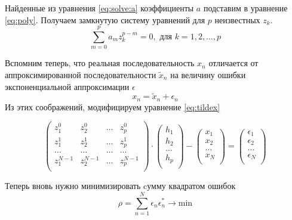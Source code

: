 \documentclass[a4paper,14pt]{extarticle}
\begin{document}
Найденные из уравнения \eqref{eq:solve:a} коэффициенты $a$ подставим в
уравнение  \eqref{eq:poly}. Получаем замкнутую систему уравнений для $p$
неизвестных  $z_k$.
\begin{equation}
    \sum\limits_{m=0}^{p} a_m z_k^{p-m} = 0, \text{ для } k = 1,2,\dots,p
\end{equation}



Вспомним теперь, что реальная последовательность $x_n$ отличается от
аппроксимированной последовательности  $\tilde x_n$ на величину ошибки
экспоненциальной аппроксимации  $\epsilon$
\begin{equation}
    \label{eq:}
    x_n = \tilde x_n + \epsilon_n
\end{equation}
Из этих соображений, модифицируем уравнение \eqref{eq:tildex} 

\begin{equation}
    \label{eq:x}
    \begin{pmatrix}
        z_1^0 & z_2^0 & \dots & z_p^0 \\ 
        z_1^1 & z_2^1 & \dots & z_p^1 \\ 
        \dots & \dots & \dots & \dots \\
        z_1^{N-1} & z_2^{N-1} & \dots & z_p^{N-1} \\ 
    \end{pmatrix}
    \cdot 
    \begin{pmatrix}
        h_1 \\ 
        h_2 \\ 
        \dots \\ 
        h_p \\ 
    \end{pmatrix}
    -
    \begin{pmatrix}
        x_1 \\ 
        x_2 \\ 
        \dots \\ 
        x_N \\ 
    \end{pmatrix}
    =
    \begin{pmatrix}
        \epsilon_1 \\ 
        \epsilon_2 \\ 
        \dots \\ 
        \epsilon_N \\ 
    \end{pmatrix}
\end{equation}

Теперь вновь нужно минимизировать cумму квадратом ошибок
\begin{equation}
    \label{eq:}
    \rho = \sum\limits_{n=1}^{N} \epsilon_n \epsilon_n^* \to \text{min} 
\end{equation}
\end{document}
